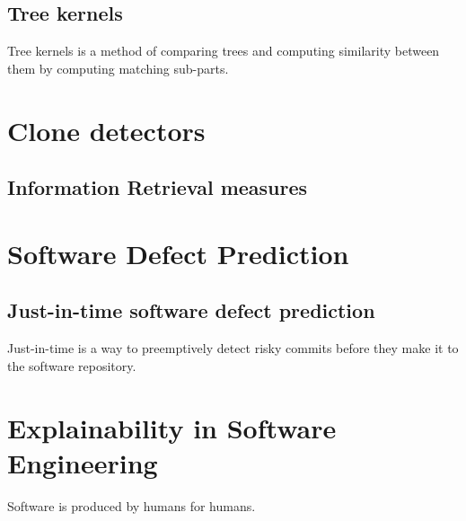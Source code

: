 \documentclass[\main/thesis.tex]{subfiles}
\begin{document}
\subsection{Tree kernels} 
Tree kernels is a method of comparing trees and computing similarity between them by computing matching sub-parts.
\section{Clone detectors}
\subsection{Information Retrieval measures}

\section{Software Defect Prediction}
\subsection{Just-in-time software defect prediction}
Just-in-time is a way to preemptively detect risky commits before they make it to the software repository.
\section{Explainability in Software Engineering}
Software is produced by humans for humans.
\end{document}

